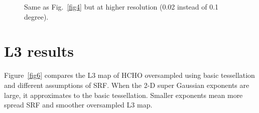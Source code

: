 \documentclass[hidelinks,12pt]{article}
\begin{document}
\begin{figure}[hbtp]
 \centering
 \quad \quad
{}  \caption{Same as Fig.~\ref{fig4} but at higher resolution (0.02 instead of 0.1 degree).}
    \label{fig5}
\end{figure}

\FloatBarrier

\section{L3 results}
Figure~\ref{fig6} compares the L3 map of HCHO oversampled using basic tessellation and different assumptions of SRF. When the 2-D super Gaussian exponents are large, it approximates to the basic tessellation. Smaller exponents mean more spread SRF and smoother oversampled L3 map.
\end{document}
